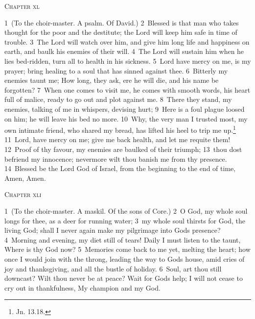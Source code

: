 \documentclass[10pt]{book} %
\begin{document}
\begin{large}\begin{center}\textsc{Chapter xl}\end{center}\end{large}
\textcolor{benred8}{1}~(To the choir-master. A psalm. Of David.)
\textcolor{benred8}{2}~Blessed is that man who takes thought for the poor and the destitute; the Lord will keep him safe in time of trouble. \textcolor{benred8}{3}~The Lord will watch over him, and give him long life and happiness on earth, and baulk his enemies of their will. \textcolor{benred8}{4}~The Lord will sustain him when he lies bed-ridden, turn all to health in his sickness.
\textcolor{benred8}{5}~Lord have mercy on me, is my prayer; bring healing to a soul that has sinned against thee. \textcolor{benred8}{6}~Bitterly my enemies taunt me; How long, they ask, ere he will die, and his name be forgotten? \textcolor{benred8}{7}~When one comes to visit me, he comes with smooth words, his heart full of malice, ready to go out and plot against me. \textcolor{benred8}{8}~There they stand, my enemies, talking of me in whispers, devising hurt; \textcolor{benred8}{9}~Here is a foul plague loosed on him; he will leave his bed no more. \textcolor{benred8}{10}~Why, the very man I trusted most, my own intimate friend, who shared my bread, has lifted his heel to trip me up.\footnote[1]{Jn. 13.18.} \textcolor{benred8}{11}~Lord, have mercy on me; give me back health, and let me requite them! \textcolor{benred8}{12}~Proof of thy favour, my enemies are baulked of their triumph; \textcolor{benred8}{13}~thou dost befriend my innocence; nevermore wilt thou banish me from thy presence.
\textcolor{benred8}{14}~Blessed be the Lord God of Israel, from the beginning to the end of time, Amen, Amen.
\begin{large}\begin{center}\textsc{Chapter xli}\end{center}\end{large}
\textcolor{benred8}{1}~(To the choir-master. A maskil. Of the sons of Core.)
\textcolor{benred8}{2}~O God, my whole soul longs for thee, as a deer for running water; \textcolor{benred8}{3}~my whole soul thirsts for God, the living God; shall I never again make my pilgrimage into God\textquotesingle s presence? \textcolor{benred8}{4}~Morning and evening, my diet still of tears! Daily I must listen to the taunt, Where is thy God now? \textcolor{benred8}{5}~Memories come back to me yet, melting the heart; how once I would join with the throng, leading the way to God\textquotesingle s house, amid cries of joy and thanksgiving, and all the bustle of holiday. \textcolor{benred8}{6}~Soul, art thou still downcast? Wilt thou never be at peace? Wait for God\textquotesingle s help; I will not cease to cry out in thankfulness, My champion and my God.
\end{document}
